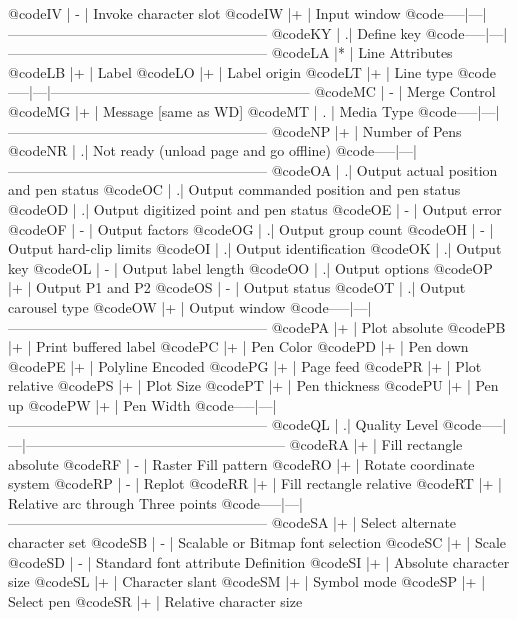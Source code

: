 @code{IV   | - | Invoke character slot}
@code{IW   |+  | Input window}
@code{-----|---|--------------------------------------------------------}
@code{KY   |  .| Define key}
@code{-----|---|--------------------------------------------------------}
@code{LA   |*  | Line Attributes}
@code{LB   |+  | Label}
@code{LO   |+  | Label origin}
@code{LT   |+  | Line type}
@code{-----|---|--------------------------------------------------------}
@code{MC   | - | Merge Control}
@code{MG   |+  | Message [same as WD]}
@code{MT   | . | Media Type}
@code{-----|---|--------------------------------------------------------}
@code{NP   |+  | Number of Pens}
@code{NR   |  .| Not ready (unload page and go offline)}
@code{-----|---|--------------------------------------------------------}
@code{OA   |  .| Output actual position and pen status}
@code{OC   |  .| Output commanded position and pen status}
@code{OD   |  .| Output digitized point and pen status}
@code{OE   | - | Output error}
@code{OF   | - | Output factors}
@code{OG   |  .| Output group count}
@code{OH   | - | Output hard-clip limits}
@code{OI   |  .| Output identification}
@code{OK   |  .| Output key}
@code{OL   | - | Output label length}
@code{OO   |  .| Output options}
@code{OP   |+  | Output P1 and P2}
@code{OS   | - | Output status}
@code{OT   |  .| Output carousel type}
@code{OW   |+  | Output window}
@code{-----|---|--------------------------------------------------------}
@code{PA   |+  | Plot absolute}
@code{PB   |+  | Print buffered label}
@code{PC   |+  | Pen Color}
@code{PD   |+  | Pen down}
@code{PE   |+  | Polyline Encoded}
@code{PG   |+  | Page feed}
@code{PR   |+  | Plot relative}
@code{PS   |+  | Plot Size}
@code{PT   |+  | Pen thickness}
@code{PU   |+  | Pen up}
@code{PW   |+  | Pen Width}
@code{-----|---|--------------------------------------------------------}
@code{QL   |  .| Quality Level} 
@code{-----|---|--------------------------------------------------------}
@code{RA   |+  | Fill rectangle absolute}
@code{RF   | - | Raster Fill pattern}
@code{RO   |+  | Rotate coordinate system}
@code{RP   | - | Replot}
@code{RR   |+  | Fill rectangle relative}
@code{RT   |+  | Relative arc through Three points}
@code{-----|---|--------------------------------------------------------}
@code{SA   |+  | Select alternate character set}
@code{SB   | - | Scalable or Bitmap font selection}
@code{SC   |+  | Scale}
@code{SD   | - | Standard font attribute Definition}
@code{SI   |+  | Absolute character size}
@code{SL   |+  | Character slant}
@code{SM   |+  | Symbol mode}
@code{SP   |+  | Select pen}
@code{SR   |+  | Relative character size}
